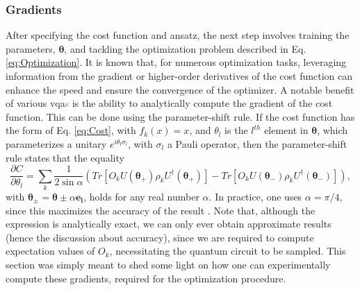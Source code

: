 \subsubsection*{\small Gradients}
After specifying the cost function and ansatz, the next step involves training the parameters, $\boldsymbol{\theta}$, and tackling the optimization problem described in Eq. \ref{eq:Optimization}. It is known that, for numerous optimization tasks, leveraging information from the gradient or higher-order derivatives of the cost function can enhance the speed and ensure the convergence of the optimizer. A notable benefit of various \acrshort{vqa}\textcolor{gray}{s} is the ability to analytically compute the gradient of the cost function. This can be done using the parameter-shift rule. If the cost function has the form of Eq. \ref{eq:Cost}, with $f_k(x) = x$, and $\theta_l$ is the $l^{th}$ element in $\boldsymbol{\theta}$, which parameterizes a unitary $e^{i\theta_l \sigma_l}$, with $\sigma_l$ a Pauli operator, then the parameter-shift rule states that the equality
\begin{equation}
    \frac{\partial C}{\partial \theta_l} = \sum_k \frac{1}{2\sin{\alpha}}\left(Tr\left[O_k U(\boldsymbol{\theta_+}) \rho_k U^{\dagger}(\boldsymbol{\theta_+})\right] - Tr\left[O_k U(\boldsymbol{\theta_-}) \rho_k U^{\dagger}(\boldsymbol{\theta_-})\right]\right),
\end{equation}
with $\boldsymbol{\theta_{\pm}} = \boldsymbol{\theta} \pm \alpha \boldsymbol{e_l}$, holds for any real number $\alpha$. In practice, one uses $\alpha = \pi/4$, since this maximizes the accuracy of the result \cite{Cerezo_2021}. Note that, although the expression is analytically exact, we can only ever obtain approximate results (hence the discussion about accuracy), since we are required to compute expectation values of $O_k$, necessitating the quantum circuit to be sampled. This section was simply meant to shed some light on how one can experimentally compute these gradients, required for the optimization procedure.

